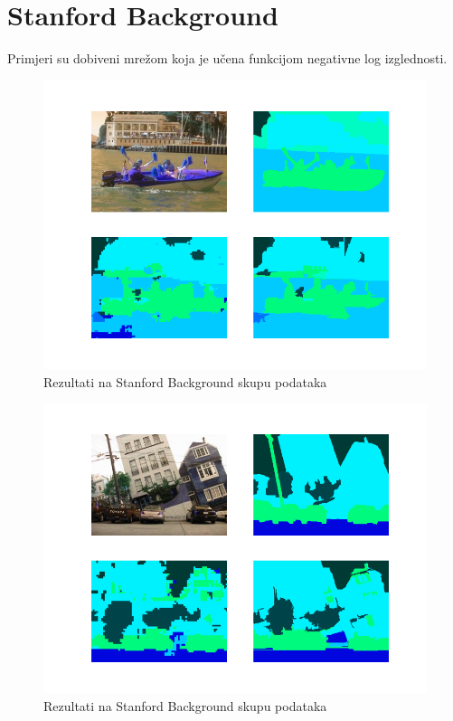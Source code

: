 \documentclass[times, utf8, diplomski, numeric]{fer}
\begin{document}
\section{Stanford Background}
Primjeri su dobiveni mrežom koja je učena funkcijom negativne log izglednosti.

\begin{figure}[H]
  \centering
  \includegraphics[width=\textwidth]{imgs/iccv-sampl2.png}
  \caption{Rezultati na Stanford Background skupu podataka}
\end{figure}

\begin{figure}[H]
  \centering
  \includegraphics[width=\textwidth]{imgs/iccv-sampl3.png}
  \caption{Rezultati na Stanford Background skupu podataka}
\end{figure}
\end{document}

